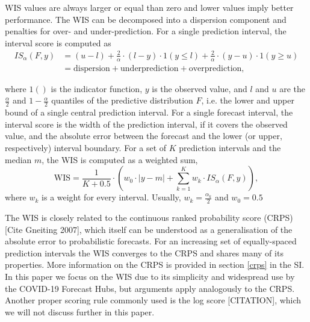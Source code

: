 \documentclass{article}
\begin{document}
WIS values are always larger or equal than zero and lower values imply better performance. The WIS can be decomposed into a dispersion component and penalties for over- and under-prediction. For a single prediction interval, the interval score is computed as 
\begin{align}
 IS_\alpha(F,y) &= (u-l) + \frac{2}{\alpha} \cdot (l-y) \cdot 1(y \leq l) + \frac{2}{\alpha} \cdot (y-u) \cdot 1(y \geq u) \\
 &= \text{dispersion} + \text{underprediction} + \text{overprediction},    
\end{align}

where $1()$ is the indicator function, $y$ is the observed value, and $l$ and $u$ are the $\frac{\alpha}{2}$ and $1 - \frac{\alpha}{2}$ quantiles of the predictive distribution $F$, i.e. the lower and upper bound of a single central prediction interval. For a single forecast interval, the interval score is the width of the prediction interval, if it covers the observed value, and the absolute error between the forecast and the lower (or upper, respectively) interval boundary. For a set of $K$ prediction intervals and the median $m$, the WIS is computed as a weighted sum, 
\begin{equation}
\text{WIS} = \frac{1}{K + 0.5} \cdot \left(w_0 \cdot |y - m| + \sum_{k = 1}^{K} w_k \cdot IS_{\alpha}(F, y)\right),    
\end{equation} 
where $w_k$ is a weight for every interval. Usually, $w_k = \frac{\alpha_k}{2}$ and $w_0 = 0.5$

The WIS is closely related to the continuous ranked probability score (CRPS) [Cite Gneiting 2007], which itself can be understood as a generalisation of the absolute error to probabilistic forecasts. For an increasing set of equally-spaced prediction intervals the WIS converges to the CRPS and shares many of its properties. More information on the CRPS is provided in section \ref{crps} in the SI. In this paper we focus on the WIS due to its simplicity and widespread use by the COVID-19 Forecast Hubs, but arguments apply analogously to the CRPS. Another proper scoring rule commonly used is the log score [CITATION], which we will not discuss further in this paper.  

%
\end{document}
